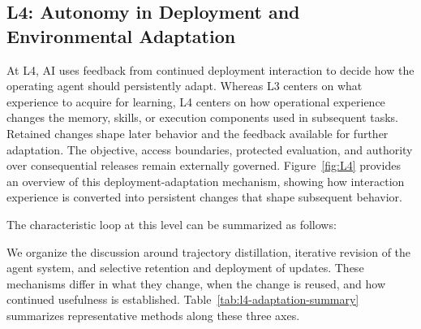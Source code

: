 \subsection{L4: Autonomy in Deployment and Environmental Adaptation}

At L4, AI uses feedback from continued deployment interaction to decide
how the operating agent should persistently adapt.
Whereas L3 centers on what experience to acquire for learning, L4 centers
on how operational experience changes the memory, skills, or execution
components used in subsequent tasks.
Retained changes shape later behavior and the feedback available for
further adaptation.
The objective, access boundaries, protected evaluation, and authority
over consequential releases remain externally governed. 
Figure~\ref{fig:L4} provides an overview of this deployment-adaptation
mechanism, showing how interaction experience is converted into persistent
changes that shape subsequent behavior.

The characteristic loop at this level can be summarized as follows:

\begin{center}
\end{center}

We organize the discussion around trajectory distillation, iterative
revision of the agent system, and selective retention and deployment of
updates. These mechanisms differ in what they change, when the change is
reused, and how continued usefulness is established.
Table~\ref{tab:l4-adaptation-summary} summarizes representative methods
along these three axes.


